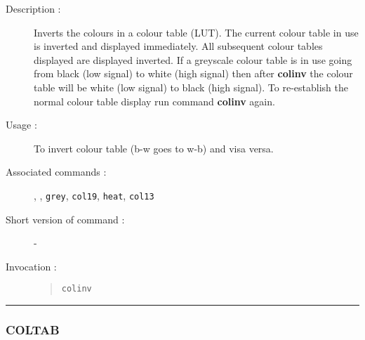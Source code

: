 \begin{description}

\item[Description :] Inverts the colours in a colour table (LUT).  The
current colour table in use is inverted and displayed immediately.  All
subsequent colour tables displayed are displayed inverted.  If a
greyscale colour table is in use going from black (low signal) to white
(high signal) then after {\bf colinv} the colour table will be white (low
signal) to black (high signal).  To re-establish the normal colour
table display run command {\bf colinv} again.

\item[Usage :] To invert colour table (b-w goes to w-b) and visa versa.
\item[Associated commands :] {\tt {}}, 
{\tt {}}, 
{\tt grey}, {\tt col19}, {\tt heat}, {\tt col13}
\item[Short version of command :] -
\item[Invocation :]

\begin{quote}{\tt  colinv }\end{quote}

\end{description}

\hrule 
\subsubsection*{\label{COLTAB}COLTAB}

